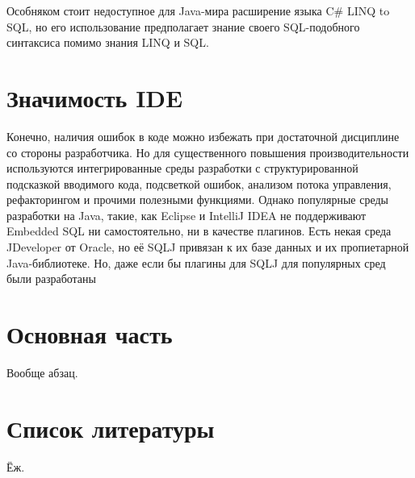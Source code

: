 \documentclass[12pt]{article}
\begin{document}
Особняком стоит недоступное для Java-мира расширение языка C\# LINQ to SQL, но его использование предполагает знание своего SQL-подобного синтаксиса помимо знания LINQ и SQL.\\

\section{Значимость IDE}
Конечно, наличия ошибок в коде можно избежать при достаточной дисциплине со стороны разработчика. Но для существенного повышения производительности используются интегрированные среды разработки с структурированной подсказкой вводимого кода, подсветкой ошибок, анализом потока управления, рефакторингом и прочими полезными функциями. Однако популярные среды разработки на Java, такие, как Eclipse и IntelliJ IDEA не поддерживают Embedded SQL ни самостоятельно, ни в качестве плагинов. Есть некая среда JDeveloper от Oracle, но её SQLJ привязан к их базе данных и их пропиетарной Java-библиотеке. Но, даже если бы плагины для SQLJ для популярных сред были разработаны

\section{Основная часть}
Вообще абзац.

\section{Список литературы}
Ёж.
\end{document}
